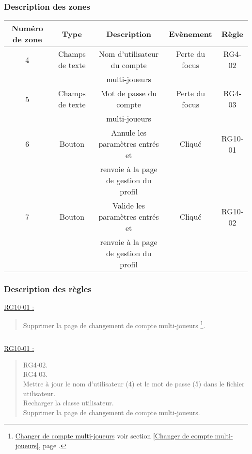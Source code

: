 \documentclass{report}
\begin{document}
		\subsubsection{Description des zones}
		
			\begin{tabular}{|c|c|c|c|c|} \hline
				Numéro de zone & Type  & Description & Evènement &	Règle \\\hline
				4 & Champs de texte & Nom d'utilisateur du compte &  Perte du focus & RG4-02 \\
				  &                 & multi-joueurs               & & \\\hline
				5 & Champs de texte & Mot de passe du compte & Perte du focus & RG4-03 \\
				  &                 & multi-joueurs          & & \\\hline
				6 & Bouton & Annule les paramètres entrés et & Cliqué & RG10-01 \\
				  &        & renvoie à la page de gestion du profil & & \\\hline
				7 & Bouton & Valide les paramètres entrés et & Cliqué & RG10-02 \\
				  &        & renvoie à la page de gestion du profil & & \\\hline
			\end{tabular}
			
		\subsubsection{Description des règles}

			\underline{RG10-01 :}
				\begin{quote}
					Supprimer la page de changement de compte multi-joueurs%
						\footnote[1]{
							\hyperlink{Changer de compte multi-joueurs}{Changer de compte multi-joueurs}
							\og voir section \ref{Changer de compte multi-joueurs}, page \pageref{Changer de compte multi-joueurs}.\fg
						}.
				\end{quote}
				
			$\,$
				
			\underline{RG10-01 :}
				\begin{quote}
					RG4-02.\\
					RG4-03.\\
					Mettre à jour le nom d'utilisateur (4) et le mot de passe (5) dans le fichier utilisateur.\\
					Recharger la classe utilisateur.\\
					Supprimer la page de changement de compte multi-joueurs\footnotemark[4].
				\end{quote}
\end{document}
